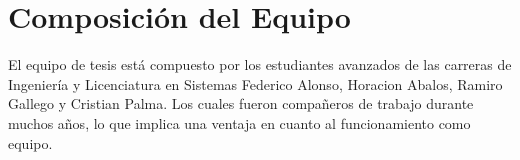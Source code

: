 \section{Composición del Equipo}\label{sec:composicionDelEquipo}

El equipo de tesis está compuesto por los estudiantes avanzados de las carreras de Ingeniería y Licenciatura en Sistemas Federico Alonso, Horacion Abalos, Ramiro Gallego y Cristian Palma. Los cuales fueron compañeros de trabajo durante muchos años, lo que implica una ventaja en cuanto al funcionamiento como equipo.